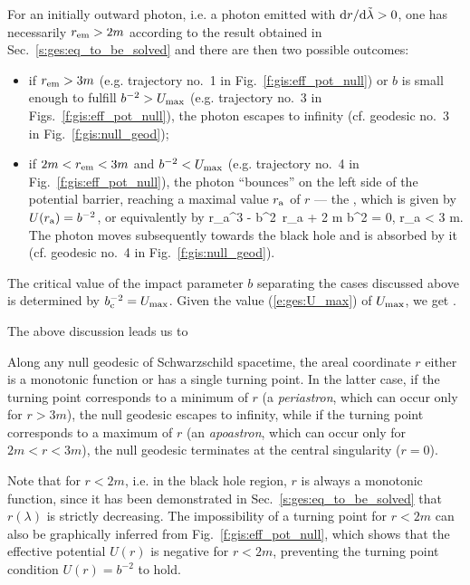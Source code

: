 For an initially outward photon, i.e. a photon emitted with ${\mathrm{d} r}/{\mathrm{d}\tilde{\lambda}} > 0$,
one has necessarily $r_{\rm em}>2m$ according to the result obtained in Sec.~\ref{s:ges:eq_to_be_solved}
and there are then two possible outcomes:

\begin{itemize}
\item if $r_{\rm em} > 3 m$ (e.g. trajectory
no.~1 in Fig.~\ref{f:gis:eff_pot_null}) or
$b$ is small enough to fulfill $b^{-2} > U_{\rm max}$ (e.g. trajectory
no.~3 in Figs.~\ref{f:gis:eff_pot_null}), the photon escapes to infinity
(cf. geodesic no.~3 in Fig.~\ref{f:gis:null_geod});
\item if $2m < r_{\rm em} < 3 m$ and $b^{-2} < U_{\rm max}$ (e.g. trajectory
no.~4 in Fig.~\ref{f:gis:eff_pot_null}), the photon ``bounces'' on the left
side of the potential barrier, reaching a maximal value $r_{\rm a}$ of $r$
--- the ,
which is given by  $U(r_{\rm a}) = b^{-2}$, or equivalently by
\be \label{e:ges:r_apo_null}
   r_{\rm a}^3 - b^2\, r_{\rm a} + 2 m b^2 = 0, \quad r_{\rm a} < 3 m.
\ee
The photon moves subsequently towards the black hole and
is absorbed by it (cf. geodesic no.~4 in Fig.~\ref{f:gis:null_geod}).
\end{itemize}

The critical value of the impact parameter $b$ separating the cases discussed
above is determined by $b_{\rm c}^{-2} = U_{\rm max}$.
Given the value (\ref{e:ges:U_max}) of $U_{\rm max}$, we get
\be \label{e:ges:b_crit}
    .
\ee

The above discussion leads us to
\begin{prop}
Along any null geodesic of Schwarzschild spacetime, the areal coordinate $r$
either is a monotonic function or has a single turning point. In the latter case,
if the turning point corresponds to a minimum of $r$ (a \emph{periastron}, which can occur
only for $r>3m$), the null geodesic escapes to infinity, while if the turning
point corresponds to a maximum of $r$ (an \emph{apoastron}, which can occur only for $2m<r<3m$), the
null geodesic terminates at the central singularity ($r=0$).
\end{prop}
Note that for $r<2m$, i.e. in the black hole region, $r$
is always a monotonic function, since it has been demonstrated in
Sec.~\ref{s:ges:eq_to_be_solved} that $r(\lambda)$ is strictly
decreasing. The impossibility of a turning point for $r<2m$ can also be
graphically inferred from Fig.~\ref{f:gis:eff_pot_null}, which shows
that the effective potential $U(r)$ is negative for $r<2m$,
preventing the turning point condition $U(r) = b^{-2}$ to hold.


